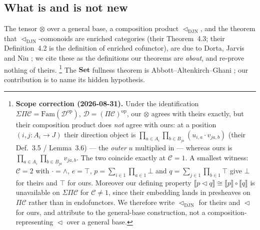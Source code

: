 \documentclass[11pt]{amsart}
\theoremstyle{plain}
\theoremstyle{definition}
\theoremstyle{remark}
\newcommand{\Set}{\mathbf{Set}}
\newcommand{\Fam}{\mathrm{Fam}}
\newcommand{\ext}[1]{\llbracket #1 \rrbracket}
\renewcommand{\lhd}{\vartriangleleft}
\newcommand{\op}{\mathrm{op}}
\begin{document}
\subsection{What is and is not new}
The tensor $\otimes$ over a general base, a composition product $\lhd_{\mathrm{DJN}}$, and the theorem
that $\lhd_{\mathrm{DJN}}$-comonoids are enriched categories (their Theorem~4.3; their Definition~4.2 is
the definition of enriched cofunctor), are due to Dorta, Jarvis and Niu \cite{DJN}; we cite these
as the definitions our theorems are \emph{about}, and re-prove nothing of theirs.
\footnote{\textbf{Scope correction (2026-08-31).} Under the identification
$\Sigma\Pi\mathcal C=\Fam(\mathcal D^\op)$, $\mathcal D=(\Pi\mathcal C)^\op$, our $\otimes$ agrees with
theirs exactly, but their composition product does \emph{not} agree with ours: at a position
$(i,j\colon A_i\to J)$ their direction object is
$\prod_{a\in A_i}\prod_{b\in B_{ja}}(u_{i,a}\cdot v_{ja,b})$ (their Def.~3.5 / Lemma~3.6) --- the
\emph{outer} $u$ multiplied in --- whereas ours is $\prod_{a\in A_i}\prod_{b\in B_{ja}}v_{ja,b}$. The two
coincide exactly at $\mathcal C=1$. A smallest witness: $\mathcal C=2$ with $\cdot=\wedge$, $e=\top$,
$p=\sum_{i\in 1}\prod_{a\in 1}\bot$ and $q=\sum_{j\in 1}\prod_{b\in 1}\top$ give $\bot$ for theirs and
$\top$ for ours. Moreover our defining property $\ext{p\lhd q}\cong\ext p\circ\ext q$ is unavailable on
$\Sigma\Pi\mathcal C$ for $\mathcal C\neq 1$, since their embedding lands in presheaves on
$\Pi\mathcal C$ rather than in endofunctors. We therefore write $\lhd_{\mathrm{DJN}}$ for theirs and
$\lhd$ for ours, and attribute to \cite{DJN} the general-base construction, not a
composition-representing $\lhd$ over a general base.} The $\Set$ fullness
theorem is Abbott--Altenkirch--Ghani \cite{AAG}; our contribution is to name its hidden hypothesis.
\end{document}
